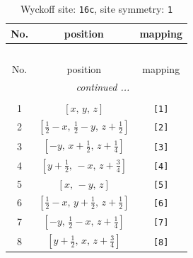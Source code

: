 \documentclass[fleqn,8pt]{jsarticle}
\begin{document}
\renewcommand{\arraystretch}{1.2}
\begin{longtable}{ccc}
\caption{Wyckoff site: {\tt 16c}, site symmetry: {\tt 1}}
 \\
 \hline \hline
No. & position & mapping \\ \hline \endfirsthead

\multicolumn{2}{l}{\tablename\ \thetable{}} \\
 \hline \hline
No. & position & mapping \\ \hline \endhead

 \hline \hline
\multicolumn{2}{r}{\footnotesize\it continued ...} \\ \endfoot

 \hline \hline
\multicolumn{2}{r}{} \\ \endlastfoot

1 & $\left[ x,\, y,\, z \right]$ & {\tt [1]} \\ \hline
2 & $\left[ \frac{1}{2} - x,\, \frac{1}{2} - y,\, z + \frac{1}{2} \right]$ & {\tt [2]} \\ \hline
3 & $\left[ - y,\, x + \frac{1}{2},\, z + \frac{1}{4} \right]$ & {\tt [3]} \\ \hline
4 & $\left[ y + \frac{1}{2},\, - x,\, z + \frac{3}{4} \right]$ & {\tt [4]} \\ \hline
5 & $\left[ x,\, - y,\, z \right]$ & {\tt [5]} \\ \hline
6 & $\left[ \frac{1}{2} - x,\, y + \frac{1}{2},\, z + \frac{1}{2} \right]$ & {\tt [6]} \\ \hline
7 & $\left[ - y,\, \frac{1}{2} - x,\, z + \frac{1}{4} \right]$ & {\tt [7]} \\ \hline
8 & $\left[ y + \frac{1}{2},\, x,\, z + \frac{3}{4} \right]$ & {\tt [8]} \\
\end{longtable}
\end{document}
